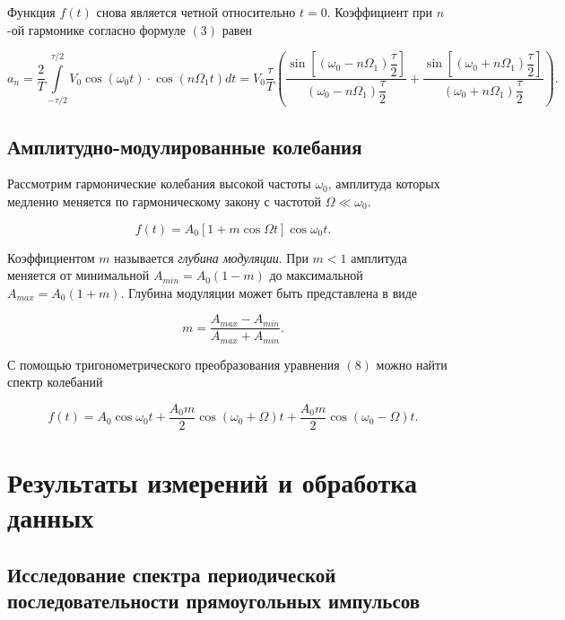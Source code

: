\documentclass[a4paper]{article}
\theoremstyle{definition}
\theoremstyle{remark}
\begin{document}
Функция $f(t)$ снова является четной относительно $t = 0$. Коэффициент при $n$-ой гармонике согласно формуле $(3)$ равен

\begin{equation*}
a_n = \dfrac{2}{T}\int\limits_{-\tau/2}^{\tau/2}V_0 \cos \left(\omega_0t\right) \cdot \cos\left(n \Omega_1t\right)dt = V_0 \dfrac{\tau}{T}\left( \dfrac{\sin\left[\left(\omega_0 - n \Omega_1\right)\dfrac{\tau}{2}\right]}{\left( \omega_0 - n \Omega_1\right) \dfrac{\tau}{2}} + \dfrac{\sin\left[\left(\omega_0 + n \Omega_1\right)\dfrac{\tau}{2}\right]}{\left( \omega_0 + n \Omega_1\right) \dfrac{\tau}{2}}\right).
\end{equation*}

\subsection{Амплитудно-модулированные колебания}

Рассмотрим гармонические колебания высокой частоты $\omega_0$, амплитуда которых медленно меняется по гармоническому закону с частотой $\Omega \ll \omega_0$.

\begin{equation}
f(t) = A_0 \left[1+m\cos \Omega t\right] \cos \omega_0 t.
\end{equation}

\noindent Коэффициентом $m$ называется \textit{глубина модуляции}. При $m < 1$ амплитуда меняется от минимальной $A_{min} = A_0(1-m)$ до максимальной $A_{max} = A_0(1+m)$. Глубина модуляции может быть представлена в виде

\begin{equation}
m = \dfrac{A_{max}-A_{min}}{A_{max}+A_{min}}.
\end{equation}

\noindent С помощью тригонометрического преобразования уравнения $(8)$ можно найти спектр колебаний

\begin{equation}
f(t) = A_0 \cos \omega_0t + \dfrac{A_0m}{2} \cos \left(\omega_0 + \Omega\right)t + \dfrac{A_0m}{2}\cos\left(\omega_0 - \Omega\right)t.
\end{equation}

\newpage

\section{Результаты измерений и обработка данных}

\subsection{Исследование спектра периодической последовательности прямоугольных импульсов}
\end{document}
